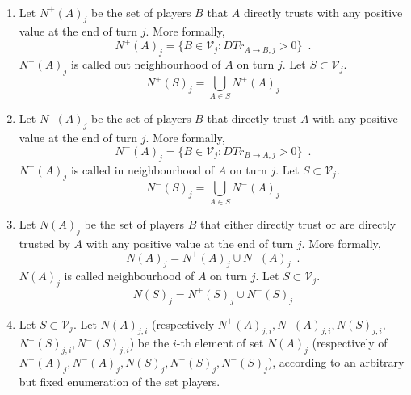 \documentclass[11pt]{llncs}
\begin{document}
     \begin{definition} \
        \begin{enumerate}
           \item Let $N^{+}\left(A\right)_j$ be the set of players $B$ that $A$ directly trusts with any positive value at
              the end of turn $j$. More formally,
              \begin{equation}
                 N^{+}\left(A\right)_j = \{B \in \mathcal{V}_j : DTr_{A \rightarrow B, j} > 0\} \enspace.
              \end{equation}
              $N^{+}\left(A\right)_j$ is called out neighbourhood of $A$ on turn $j$. Let $S \subset \mathcal{V}_j$.
              \begin{equation}
                 N^{+}\left(S\right)_j = \bigcup\limits_{A \in S}N^{+}\left(A\right)_j
              \end{equation}
           \item Let $N^{-}\left(A\right)_j$ be the set of players $B$ that directly trust $A$ with any positive value at the
              end of turn $j$. More formally,
              \begin{equation}
                 N^{-}\left(A\right)_j = \{B \in \mathcal{V}_j : DTr_{B \rightarrow A, j} > 0\} \enspace.
              \end{equation}
              $N^{-}\left(A\right)_j$ is called in neighbourhood of $A$ on turn $j$. Let $S \subset \mathcal{V}_j$.
              \begin{equation}
                 N^{-}\left(S\right)_j = \bigcup\limits_{A \in S}N^{-}\left(A\right)_j
              \end{equation}
           \item Let $N\left(A\right)_j$ be the set of players $B$ that either directly trust or are directly trusted by $A$
              with any positive value at the end of turn $j$. More formally,
              \begin{equation}
                 N\left(A\right)_j = N^{+}\left(A\right)_j \cup N^{-}\left(A\right)_j \enspace.
              \end{equation}
              $N\left(A\right)_j$ is called neighbourhood of $A$ on turn $j$. Let $S \subset \mathcal{V}_j$.
              \begin{equation}
                 N\left(S\right)_j = N^{+}\left(S\right)_j \cup N^{-}\left(S\right)_j
              \end{equation}
           \item Let $S \subset \mathcal{V}_j$. Let $N\left(A\right)_{j,i}$ (respectively $N^{+}\left(A\right)_{j,i},
              N^{-}\left(A\right)_{j,i}, N\left(S\right)_{j,i},$ $N^{+}\left(S\right)_{j,i}, N^{-}\left(S\right)_{j,i}$) be
              the $i$-th element of set $N\left(A\right)_j$ (respectively of $N^{+}\left(A\right)_j,  N^{-}\left(A\right)_j,
              N\left(S\right)_j, N^{+}\left(S\right)_j, N^{-}\left(S\right)_j$), according to an arbitrary but fixed
              enumeration of the set players.
        \end{enumerate}
     \end{definition}
\end{document}
